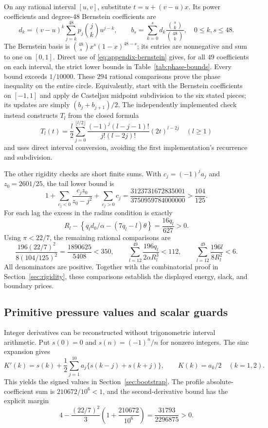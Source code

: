 \documentclass[11pt,reqno]{amsart}
\numberwithin{equation}{section}
\begin{document}
On any rational interval $[u,v]$, substitute $t=u+(v-u)x$.
Its power coefficients and degree-48 Bernstein coefficients are
\begin{equation}
 d_k=(v-u)^k\sum_{j=k}^{48}p_j\binom jk u^{j-k},\qquad
 b_s=\sum_{k=0}^s d_k\frac{\binom sk}{\binom{48}k},
 \quad0\le k,s\le48.
 \label{eq:appendix-bernstein}
\end{equation}
The Bernstein basis is
$\binom{48}s x^s(1-x)^{48-s}$; its entries are nonnegative and
sum to one on $[0,1]$. Direct use of
\eqref{eq:appendix-bernstein} gives, for all $49$ coefficients on
each interval, the strict lower bounds in Table~\ref{tab:phase-bounds}.
Every bound exceeds $1/10000$. These $294$ rational comparisons
prove the phase inequality on the entire circle. Equivalently, start
with the Bernstein coefficients on $[-1,1]$ and apply de Casteljau
midpoint subdivision to the six stated pieces; its updates are simply
$(b_j+b_{j+1})/2$. The independently implemented check instead
constructs $T_l$ from the closed formula
\[
 T_l(t)=\frac l2\sum_{j=0}^{\lfloor l/2\rfloor}
 \frac{(-1)^j(l-j-1)!}{j!(l-2j)!}(2t)^{l-2j}
 \quad(l\ge1)
\]
and uses direct interval conversion, avoiding the first implementation's
recurrence and subdivision.

The other rigidity checks are short finite sums. With $c_j=(-1)^ja_j$
and $z_0=2601/25$, the tail lower bound is
\[
 1+\sum_{c_j<0}\frac{c_jz_0}{z_0-j^2}+\sum_{c_j>0}c_j
 =\frac{3123731672835001}{3750959784000000}>\frac{104}{125}.
\]
For each lag the excess in the radius condition is exactly
\[
 R_l-\left\{q_ld_0/\alpha-(7q_l-l)\theta\right\}
 =\frac{16q_l}{627}>0.
\]
Using $\pi<22/7$, the remaining rational comparisons are
\begin{equation}
 \frac{196(22/7)^2}{8(104/125)^2}
 =\frac{1890625}{5408}<350,\qquad
 \sum_{l=12}^{49}\frac{196q_l}{2\alpha R_l^3}<112,
 \qquad
 \sum_{l=12}^{49}\frac{196l}{8R_l^2}<6.
 \label{eq:appendix-resource-checks}
\end{equation}
All denominators are positive. Together with the combinatorial proof in
Section~\ref{sec:rigidity}, these comparisons establish the displayed
energy, slack, and boundary prices.

\subsection{Primitive pressure values and scalar guards}

Integer derivatives can be reconstructed without trigonometric interval
arithmetic. Put $s(0)=0$ and $s(n)=(-1)^n/n$ for nonzero integers.
The sinc expansion gives
\[
 K'(k)=s(k)+\frac12\sum_{j=1}^{10}a_j\{s(k-j)+s(k+j)\},
 \qquad K(k)=a_k/2\quad(k=1,2).
\]
This yields the signed values in Section~\ref{sec:bootstrap}.
The profile absolute-coefficient sum is $210672/10^6<1$, and
the second-derivative bound has the explicit margin
\[
 4-\frac{(22/7)^2}{3}\left(1+\frac{210672}{10^6}\right)
 =\frac{31793}{2296875}>0.
\]
\end{document}
